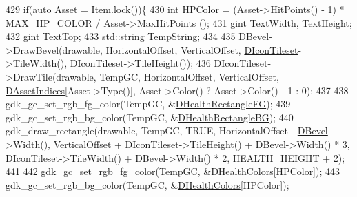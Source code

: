 \begin{DoxyCode}
429                 \textcolor{keywordflow}{if}(\textcolor{keyword}{auto} Asset = Item.lock())\{
430                     \textcolor{keywordtype}{int} HPColor = (Asset->HitPoints() - 1) * \hyperlink{UnitDescriptionRenderer_8cpp_a0ab547ca394354fc0fadb53832ad086e}{MAX\_HP\_COLOR} / Asset->MaxHitPoints
      ();
431                     gint TextWidth, TextHeight;
432                     gint TextTop;
433                     std::string TempString;
434                     
435                     \hyperlink{classCUnitDescriptionRenderer_a9f4cd9f9d8dbc5036c885980494db41e}{DBevel}->DrawBevel(drawable, HorizontalOffset, VerticalOffset, 
      \hyperlink{classCUnitDescriptionRenderer_aadf76b5c018d76c3ff7bd8edc021d702}{DIconTileset}->TileWidth(), \hyperlink{classCUnitDescriptionRenderer_aadf76b5c018d76c3ff7bd8edc021d702}{DIconTileset}->TileHeight());
436                     \hyperlink{classCUnitDescriptionRenderer_aadf76b5c018d76c3ff7bd8edc021d702}{DIconTileset}->DrawTile(drawable, TempGC, HorizontalOffset, VerticalOffset, 
      \hyperlink{classCUnitDescriptionRenderer_a3d311375ab23745786d20076842e3099}{DAssetIndices}[Asset->Type()], Asset->Color() ? Asset->Color() - 1 : 0);
437                     
438                     gdk\_gc\_set\_rgb\_fg\_color(TempGC, &\hyperlink{classCUnitDescriptionRenderer_a0853b06022be60337a5015efb90666bd}{DHealthRectangleFG});
439                     gdk\_gc\_set\_rgb\_bg\_color(TempGC, &\hyperlink{classCUnitDescriptionRenderer_ac3f81e657b619785c3babd9026b7c6d2}{DHealthRectangleBG});
440                     gdk\_draw\_rectangle(drawable, TempGC, TRUE, HorizontalOffset - 
      \hyperlink{classCUnitDescriptionRenderer_a9f4cd9f9d8dbc5036c885980494db41e}{DBevel}->Width(), VerticalOffset + \hyperlink{classCUnitDescriptionRenderer_aadf76b5c018d76c3ff7bd8edc021d702}{DIconTileset}->TileHeight() + 
      \hyperlink{classCUnitDescriptionRenderer_a9f4cd9f9d8dbc5036c885980494db41e}{DBevel}->Width() * 3,  \hyperlink{classCUnitDescriptionRenderer_aadf76b5c018d76c3ff7bd8edc021d702}{DIconTileset}->TileWidth() + \hyperlink{classCUnitDescriptionRenderer_a9f4cd9f9d8dbc5036c885980494db41e}{DBevel}->Width() * 2, 
      \hyperlink{UnitDescriptionRenderer_8cpp_a60b382357264e3e39799a678c7f21e38}{HEALTH\_HEIGHT} + 2);
441                     
442                     gdk\_gc\_set\_rgb\_fg\_color(TempGC, &\hyperlink{classCUnitDescriptionRenderer_afa1e3591f74862f7640695f0f6125bc7}{DHealthColors}[HPColor]);
443                     gdk\_gc\_set\_rgb\_bg\_color(TempGC, &\hyperlink{classCUnitDescriptionRenderer_afa1e3591f74862f7640695f0f6125bc7}{DHealthColors}[HPColor]);

\end{DoxyCode}
